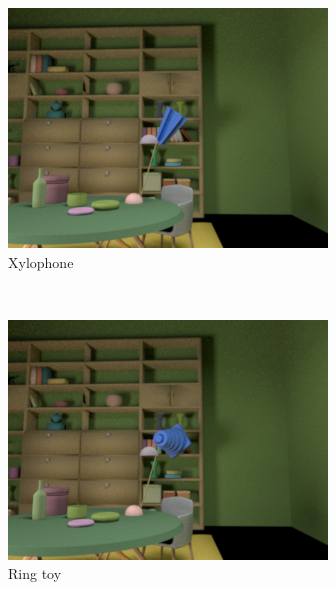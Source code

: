 \documentclass{jov}
\begin{document}
\begin{figure}[h]
    \begin{subfigure}[b]{0.22 \textwidth}
        \includegraphics[width=\textwidth]{Figure12/libraryWithXylophone.png}
        \caption{Xylophone}
        \label{fig:libraryWithXylophone}
    \end{subfigure}
    ~
	\begin{subfigure}[b]{0.22 \textwidth}
        \includegraphics[width=\textwidth]{Figure12/libraryWithRingToy.png}
        \caption{Ring toy}
        \label{fig:libraryWithRingToy}
    \end{subfigure}
        ~
    	\begin{subfigure}[b]{0.22 \textwidth}

\end{subfigure}
\end{figure}
\end{document}
